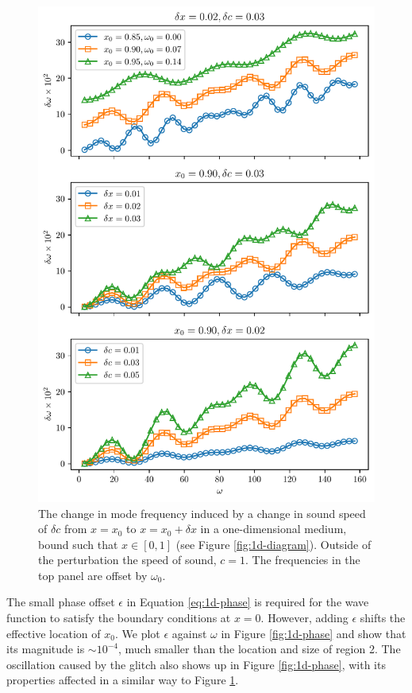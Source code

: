\begin{figure}
    \centering
    \includegraphics{figures/glitch-1d-example-results.pdf}
    \caption{The change in mode frequency induced by a change in sound speed of \(\delta c\) from \(x=x_0\) to \(x=x_0 + \delta x\) in a one-dimensional medium, bound such that \(x \in [0, 1]\) (see Figure \ref{fig:1d-diagram}). Outside of the perturbation the speed of sound, \(c=1\).
    The frequencies in the top panel are offset by \(\omega_0\).
    }
    \label{fig:1d-results}
\end{figure}


The small phase offset \(\epsilon\) in Equation \ref{eq:1d-phase} is required for the wave function to satisfy the boundary conditions at \(x = 0\). However, adding \(\epsilon\) shifts the effective location of \(x_0\). We plot \(\epsilon\) against \(\omega\) in Figure \ref{fig:1d-phase} and show that its magnitude is \(\sim 10^{-4}\), much smaller than the location and size of region 2. The oscillation caused by the glitch also shows up in Figure \ref{fig:1d-phase}, with its properties affected in a similar way to Figure \ref{fig:1d-results}.

